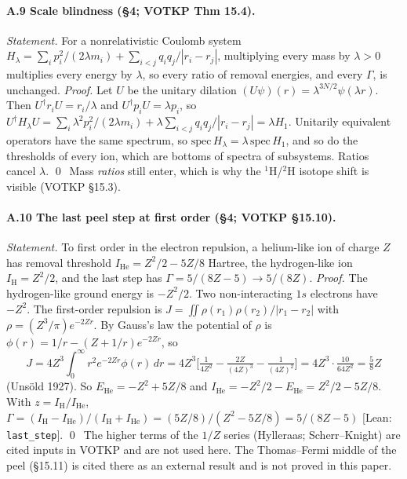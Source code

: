 \documentclass[11pt]{article}
\theoremstyle{definition}
\begin{document}
\paragraph{A.9 Scale blindness (§4; VOTKP Thm 15.4).}
\emph{Statement.} For a nonrelativistic Coulomb system $H_\lambda=\sum_i p_i^2/(2\lambda m_i)+\sum_{i<j}q_iq_j/|r_i-r_j|$, multiplying every mass by $\lambda>0$ multiplies every energy by $\lambda$, so every ratio of removal energies, and every $\Gamma$, is unchanged.
\emph{Proof.} Let $U$ be the unitary dilation $(U\psi)(r)=\lambda^{3N/2}\psi(\lambda r)$. Then $U^\dagger r_iU=r_i/\lambda$ and $U^\dagger p_iU=\lambda p_i$, so $U^\dagger H_\lambda U=\sum_i\lambda^2p_i^2/(2\lambda m_i)+\lambda\sum_{i<j}q_iq_j/|r_i-r_j|=\lambda H_1$. Unitarily equivalent operators have the same spectrum, so $\mathrm{spec}\,H_\lambda=\lambda\,\mathrm{spec}\,H_1$, and so do the thresholds of every ion, which are bottoms of spectra of subsystems. Ratios cancel $\lambda$. \qed\ Mass \emph{ratios} still enter, which is why the ${}^1$H/${}^2$H isotope shift is visible (VOTKP §15.3).

\paragraph{A.10 The last peel step at first order (§4; VOTKP §15.10).}
\emph{Statement.} To first order in the electron repulsion, a helium-like ion of charge $Z$ has removal threshold $I_{\mathrm{He}}=Z^2/2-5Z/8$ Hartree, the hydrogen-like ion $I_{\mathrm H}=Z^2/2$, and the last step has $\Gamma=5/(8Z-5)\to5/(8Z)$.
\emph{Proof.} The hydrogen-like ground energy is $-Z^2/2$. Two non-interacting $1s$ electrons have $-Z^2$. The first-order repulsion is $J=\iint\rho(r_1)\rho(r_2)/|r_1-r_2|$ with $\rho=(Z^3/\pi)e^{-2Zr}$. By Gauss's law the potential of $\rho$ is $\phi(r)=1/r-(Z+1/r)e^{-2Zr}$, so
\[
J=4Z^3\!\int_0^\infty\! r^2e^{-2Zr}\phi(r)\,dr=4Z^3\Big[\tfrac1{4Z^2}-\tfrac{2Z}{(4Z)^3}-\tfrac1{(4Z)^2}\Big]=4Z^3\cdot\tfrac{10}{64Z^2}=\tfrac58Z
\]
(Unsöld 1927). So $E_{\mathrm{He}}=-Z^2+5Z/8$ and $I_{\mathrm{He}}=-Z^2/2-E_{\mathrm{He}}=Z^2/2-5Z/8$. With $z=I_{\mathrm H}/I_{\mathrm{He}}$, $\Gamma=(I_{\mathrm H}-I_{\mathrm{He}})/(I_{\mathrm H}+I_{\mathrm{He}})=(5Z/8)/(Z^2-5Z/8)=5/(8Z-5)$ \textsf{[Lean: \texttt{last\_step}]}. \qed\ The higher terms of the $1/Z$ series (Hylleraas; Scherr–Knight) are cited inputs in VOTKP and are not used here. The Thomas–Fermi middle of the peel (§15.11) is cited there as an external result and is not proved in this paper.
\end{document}
